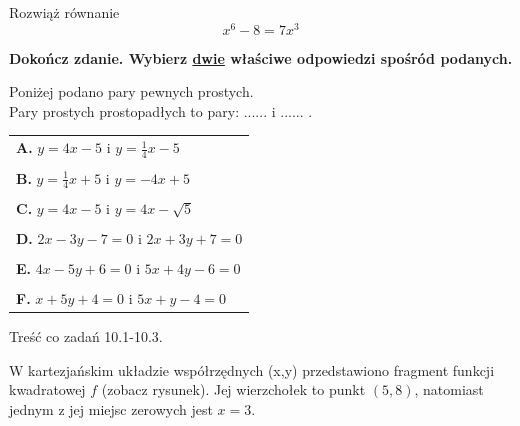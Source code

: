 \documentclass[12pt,a4paper]{article}
\theoremstyle{break}
\begin{document}
	\begin{zad}[0-3]
		Rozwiąż równanie
		$$x^6-8=7x^3$$
	\end{zad} 

	\begin{zad}[0-2]
		\textbf{Dokończ zdanie. Wybierz \underline{dwie} właściwe odpowiedzi spośród podanych.}
	\end{zad} 

	Poniżej podano pary pewnych prostych.
	\\
	
	Pary prostych prostopadłych to pary: ...... i ...... .
	
	\vspace{0.5cm}
	\begin{tabular}{p{14cm}}
		\textbf{A. }$y=4x-5$ i $y=\frac{1}{4}x-5$\\
		\\
		\textbf{B. }$y=\frac{1}{4}x+5$ i $y=-4x+5$\\
		\\
		\textbf{C. }$y=4x-5$ i $y=4x-\sqrt{5}$\\
		\\
		\textbf{D. }$2x-3y-7=0$ i $2x+3y+7=0$\\
		\\
		\textbf{E. }$4x-5y+6=0$ i $5x+4y-6=0$\\
		\\
		\textbf{F. }$x+5y+4=0$ i $5x+y-4=0$\\
	\end{tabular}
		
	
		\newpage
		\begin{zad}
			Treść co zadań 10.1-10.3.
		\end{zad}
	
		W kartezjańskim układzie współrzędnych (x,y) przedstawiono fragment funkcji kwadratowej $f$ (zobacz rysunek). Jej wierzchołek to punkt $(5,8)$, natomiast jednym z jej miejsc zerowych jest $x=3$.
		
\end{document}
